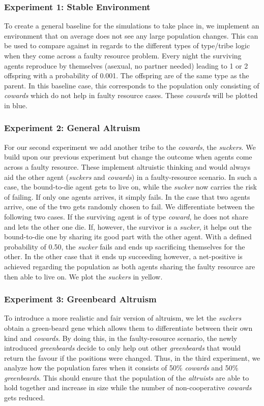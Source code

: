 \documentclass[sigconf]{acmart}
\newcommand{\VProbAltruistDies}{0.50\xspace}
\newcommand{\VProbKids}{0.001\xspace}
\newcommand{\cowards}{\textit{cowards}\xspace}
\newcommand{\coward}{\textit{coward}\xspace}
\newcommand{\altruists}{\textit{altruists}\xspace}
\newcommand{\suckers}{\textit{suckers}\xspace}
\newcommand{\sucker}{\textit{sucker}\xspace}
\newcommand{\greenbeards}{\textit{greenbeards}\xspace}
\begin{document}
    \subsubsection*{Experiment 1: Stable Environment}
    To create a general baseline for the simulations to take place in, we implement an environment that on average does not see any large population changes.
    This can be used to compare against in regards to the different types of type/tribe logic when they come across a faulty resource problem.
    Every night the surviving agents reproduce by themselves (asexual, no partner needed) leading to 1 or 2 offspring with a probability of \VProbKids.
    The offspring are of the same type as the parent.
    In this baseline case, this corresponds to the population only consisting of \cowards which do not help in faulty resource cases.
    These \cowards will be plotted in blue.

    \subsubsection*{Experiment 2: General Altruism}
    For our second experiment we add another tribe to the \cowards, the \suckers.
    We build upon our previous experiment but change the outcome when agents come across a faulty resource.
    These implement altruistic thinking and would always aid the other agent (\suckers and \cowards) in a faulty-resource scenario.
    In such a case, the bound-to-die agent gets to live on, while the \sucker now carries the risk of failing.
    If only one agents arrives, it simply fails.
    In the case that two agents arrive, one of the two gets randomly chosen to fail.
    We differentiate between the following two cases.
    If the surviving agent is of type \coward, he does not share and lets the other one die.
    If, however, the survivor is a \sucker, it helps out the bound-to-die one by sharing its good part with the other agent.
    With a defined probability of \VProbAltruistDies, the \sucker fails and ends up sacrificing themselves for the other.
    In the other case that it ends up succeeding however, a net-positive is achieved regarding the population as both agents sharing the faulty resource are then able to live on.
    We plot the \suckers in yellow.


    \subsubsection*{Experiment 3: Greenbeard Altruism}
    To introduce a more realistic and fair version of altruism, we let the \suckers obtain a green-beard gene which allows them to differentiate between their own kind and \cowards.
    By doing this, in the faulty-resource scenario, the newly introduced \greenbeards decide to only help out other \greenbeards that would return the favour if the positions were changed.
    Thus, in the third experiment, we analyze how the population fares when it consists of 50\% \cowards and 50\% \greenbeards.
    This should ensure that the population of the \altruists are able to hold together and increase in size while the number of non-cooperative \cowards gets reduced.
\end{document}
